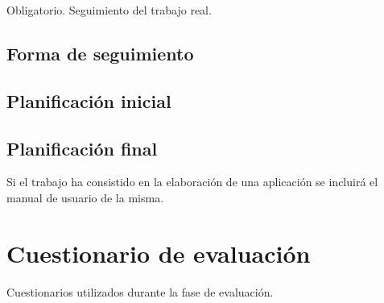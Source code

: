 \documentclass[12pt,a4paper,onecolumn,oneside]{report}
\begin{document}
Obligatorio. Seguimiento del trabajo real.

\section{Forma de seguimiento}

\section{Planificación inicial}

\section{Planificación final}
Si el trabajo ha consistido en la elaboración de una aplicación se incluirá el manual de usuario de la misma.


\chapter{Cuestionario de evaluación}
\label{Cuestionario de evaluación}

Cuestionarios utilizados durante la fase de evaluación.
\end{document}
